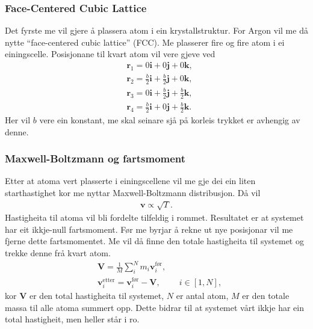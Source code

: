 \documentclass[12pt, a4paper]{article}
\theoremstyle{definition} \newtheorem*{definition}{Teorem}
\newcommand{\vb}{\mathbf}
\begin{document}
        \subsubsection*{Face-Centered Cubic Lattice}
            Det fyrste me vil gjere å plassera atom i ein krystallstruktur. For Argon
            vil me då nytte ``face-centered cubic lattice'' (FCC). Me plasserer fire og fire atom i ei einingscelle. Posisjonane til kvart atom vil vere gjeve ved
            \begin{align*}
                &\vb{r}_1 = 0\vb{i} + 0\vb{j} + 0\vb{k}, \\
                &\vb{r}_2 = \frac{b}{2}\vb{i} + \frac{b}{2}\vb{j} + 0\vb{k}, \\
                &\vb{r}_3 = 0\vb{i} + \frac{b}{2}\vb{j} + \frac{b}{2}\vb{k}, \\
                &\vb{r}_4 = \frac{b}{2}\vb{i} + 0\vb{j} + \frac{b}{2}\vb{k}.
            \end{align*}
            Her vil $b$ vere ein konstant, me skal seinare sjå på korleis trykket er avhengig av denne. \\ %

        \subsubsection*{Maxwell-Boltzmann og fartsmoment}
            Etter at atoma vert plasserte i einingscellene vil me gje dei ein liten starthastighet kor me nyttar Maxwell-Boltzmann distribusjon. Då vil
            \begin{align*}
                \vb{v} \propto \sqrt{T}.
            \end{align*}
            Hastigheita til atoma vil bli fordelte tilfeldig i rommet. Resultatet er at systemet har eit ikkje-null fartsmoment. Før me byrjar å rekne ut nye posisjonar vil
            me fjerne dette fartsmomentet. Me vil då finne den totale hastigheita til systemet og trekke denne frå kvart atom.
            \begin{align*}
                &\vb{V} = \frac{1}{M}\sum_i^N m_i\vb{v}_{i}^{\text{før}}, \\
                &\vb{v}_{i}^{\text{etter}} = \vb{v}_{i}^{\text{før}} - \vb{V}, \qquad \ i \in [1, N],
            \end{align*}
            kor $\vb{V}$ er den total hastigheita til systemet, $N$ er antal atom, $M$ er den totale massa til alle atoma summert opp. Dette bidrar til at systemet vårt
            ikkje har ein total hastigheit, men heller står i ro. \\
\end{document}
